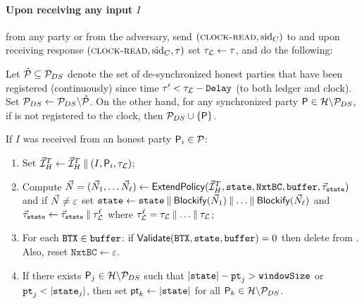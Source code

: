 \begin{cccFunctionality}
	\paragraph{Upon receiving any input $I$}
	from any party or from the adversary, send $(\textsc{clock-read}, \mathrm{sid}_C)$ to \funcClock and upon receiving response $(\textsc{clock-read}, \mathrm{sid}_C , \tau)$ set $\tau_\mathcal{L} \gets \tau$, and do the following:
	\begin{cccEnum}
		\item Let $\hat{\mathcal{P}} \subseteq \mathcal{P}_{DS}$ denote the set of de-synchronized honest parties that have been registered (continuously) since time $\tau' < \tau_\mathcal{L} - \mathtt{Delay}$ (to both ledger and clock).
		Set $\mathcal{P}_{DS} \gets \mathcal{P}_{DS} \backslash \hat{\mathcal{P}}$.
		On the other hand, for any synchronized party $\mathsf{P} \in \mathcal{H} \backslash \mathcal{P}_{DS}$, if \party is not registered to the clock, then $\mathcal{P}_{DS} \cup \{ \mathsf{P} \}$.

		\item If $I$ was received from an honest party $\mathsf{P}_i \in \mathcal{P}$:
		\begin{enumerate}[leftmargin=*, nosep]
			\item Set $\vec{\mathcal{I}}^T_H \gets \vec{\mathcal{I}}^T_H \mathbin\Vert (I, \mathsf{P}_i, \tau_\mathcal{L})$;

			\item Compute $\vec{N} = (\vec{N}_1, \ldots \vec{N}_\ell) \gets \mathsf{ExtendPolicy}(\vec{\mathcal{I}}^T_H, \mathtt{state}, \mathtt{NxtBC}, \mathtt{buffer}, \vec{\tau}_{\mathtt{state}})$ and
			      if $\vec{N} \neq \varepsilon$ set $\mathtt{state} \gets \mathtt{state} \mathbin\Vert \mathsf{Blockify}(\vec{N}_1) \mathbin\Vert \ldots \mathbin\Vert \mathsf{Blockify}(\vec{N}_\ell)$ and
			      $\vec{\tau}_{\mathtt{state}} \gets \vec{\tau}_{\mathtt{state}} \mathbin\Vert \tau_\mathcal{L}^\ell$ where $\tau_\mathcal{L}^\ell = \tau_\mathcal{L} \mathbin\Vert \ldots \mathbin\Vert \tau_\mathcal{L}$;

			\item For each $\mathtt{BTX} \in \mathtt{buffer}$: if $\mathsf{Validate}(\mathtt{BTX}, \mathtt{state}, \mathtt{buffer}) = 0$ then delete \BTX from \buffer.
			      Also, reset $\mathtt{NxtBC} \gets \varepsilon$.

			\item If there exists $\mathsf{P}_j \in \mathcal{H} \backslash \mathcal{P}_{DS}$ such that $|\mathtt{state}| - \mathtt{pt}_j > \mathtt{windowSize}$ or $\mathtt{pt}_j < |\mathtt{state}_j |$, then set $\mathsf{pt}_k \gets |\mathtt{state}|$ for all $\mathsf{P}_k \in \mathcal{H} \backslash \mathcal{P}_{DS}$.
		\end{enumerate}


\end{cccEnum}
\end{cccFunctionality}

